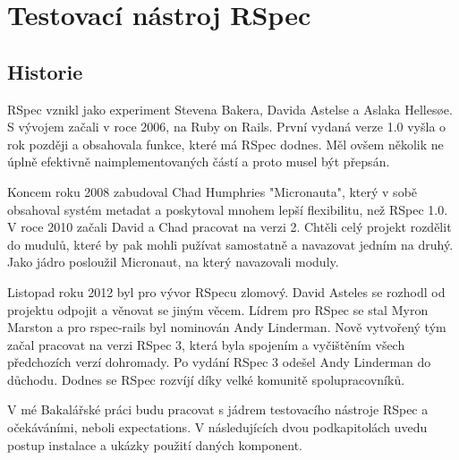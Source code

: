 \section {Testovací nástroj RSpec}
\subsection{Historie}
\par RSpec\cite{davidchelimsky2015} vznikl jako experiment Stevena Bakera, Davida Astelse a Aslaka Hellesøe. S vývojem začali v roce 2006, na Ruby on Rails. První vydaná verze 1.0 vyšla o rok později a obsahovala funkce, které má RSpec dodnes. Měl ovšem několik ne úplně efektivně naimplementovaných částí a proto musel být přepsán.
\par Koncem roku 2008 zabudoval Chad Humphries "Micronauta", který v sobě obsahoval systém metadat a poskytoval mnohem lepší flexibilitu, než RSpec 1.0. V roce 2010 začali David a Chad pracovat na verzi 2. Chtěli celý projekt rozdělit do mudulů, které by pak mohli pužívat samostatně a navazovat jedním na druhý. Jako jádro posloužil Micronaut, na který navazovali moduly.
\par Listopad roku 2012 byl pro vývor RSpecu zlomový. David Asteles se rozhodl od projektu odpojit a věnovat se jiným věcem. Lídrem pro RSpec se stal Myron Marston a pro rspec-rails byl nominován Andy Linderman. Nově vytvořený tým začal pracovat na verzi RSpec 3, která byla spojením a vyčištěním všech předchozích verzí dohromady. Po vydání RSpec 3 odešel Andy Linderman do důchodu. Dodnes se RSpec rozvíjí díky velké komunitě spolupracovníků.
\par V mé Bakalářské práci budu pracovat s jádrem testovacího nástroje RSpec a očekáváními, neboli expectations. V následujících dvou podkapitolách uvedu postup instalace a ukázky použití daných komponent.

